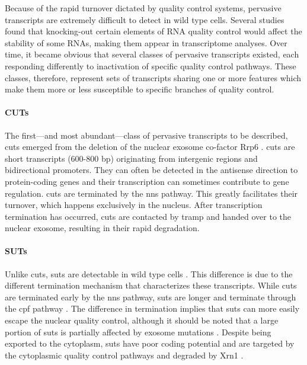 Because of the rapid turnover dictated by quality control systems, pervasive transcripts are extremely difficult to detect in wild type cells.
Several studies found that knocking-out certain elements of RNA quality control would affect the stability of some RNAs, making them appear in transcriptome analyses.
Over time, it became obvious that several classes of pervasive transcripts existed, each responding differently to inactivation of specific quality control pathways.
These classes, therefore, represent sets of transcripts sharing one or more features which make them more or less susceptible to specific branches of quality control.



\paragraph{CUTs}

The first---and most abundant---class of pervasive transcripts to be described, \gls{cuts} emerged from the deletion of the nuclear exosome co-factor Rrp6 \cite{wyers:2005:cryptic}.
\gls{cuts} are short transcripts (600-800 bp) originating from intergenic regions and bidirectional promoters.
They can often be detected in the antisense direction to protein-coding genes and their transcription can sometimes contribute to gene regulation.
\gls{cuts} are terminated by the \gls{nns} pathway.
This greatly facilitates their turnover, which happens exclusively in the nucleus.
After transcription termination has occurred, \gls{cuts} are contacted by \gls{tramp} and handed over to the nuclear exosome, resulting in their rapid degradation. 

\paragraph{SUTs}

Unlike \gls{cuts}, \gls{suts} are detectable in wild type cells \cite{david:2006:highresolution}.
This difference is due to the different termination mechanism that characterizes these transcripts.
While \gls{cuts} are terminated early by the \gls{nns} pathway, \gls{suts} are longer and terminate through the \gls{cpf} pathway \cite{marquardt:2011:distinct}.
The difference in termination implies that \gls{suts} can more easily escape the nuclear quality control, although it should be noted that a large portion of \gls{suts} is partially affected by exosome mutations \cite{gudipati:2012:extensive, marquardt:2011:distinct}.
Despite being exported to the cytoplasm, \gls{suts} have poor coding potential and are targeted by the cytoplasmic quality control pathways and degraded by Xrn1 \cite{malabat:2015:quality}. 

